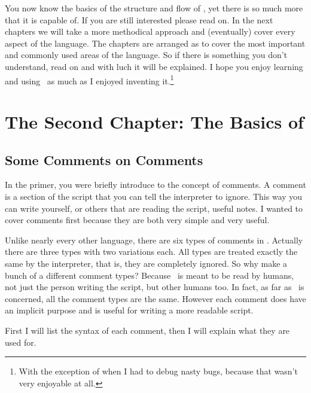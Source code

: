 \documentclass{book}
\begin{document}
You now know the basics of the structure and flow of \SSquared, yet there is so much more that it is capable of.  If you are still interested please read on.  In the next chapters we will take a more methodical approach and (eventually) cover every aspect of the language.  The chapters are arranged as to cover the most important and commonly used areas of the language.  So if there is something you don't understand, read on and with luch it will be explained. I hope you enjoy learning and using \SSquared\ as much as I enjoyed inventing it.\footnote{With the exception of when I had to debug nasty bugs, because that wasn't very enjoyable at all.}

%
%

\chapter{The Second Chapter: The Basics of \SSquared}

\section{Some Comments on Comments}
In the primer, you were briefly introduce to the concept of comments.  A comment is a section of the script that you can tell the interpreter to ignore.  This way you can write yourself, or others that are reading the script, useful notes. I wanted to cover comments first because they are both very simple and very useful.

Unlike nearly every other language, there are six types of comments in \SSquared.  Actually there are three types with two variations each.  All types are treated exactly the same by the interpreter, that is, they are completely ignored.  So why make a bunch of a different comment types?  Because \SSquared\ is meant to be read by humans, not just the person writing the script, but other humans too.  In fact, as far as \SSquaredInterpreter\ is concerned, all the comment types are the same.  However each comment does have an implicit purpose and is useful for writing a more readable script.

First I will list the syntax of each comment, then I will explain what they are used for.
\end{document}
